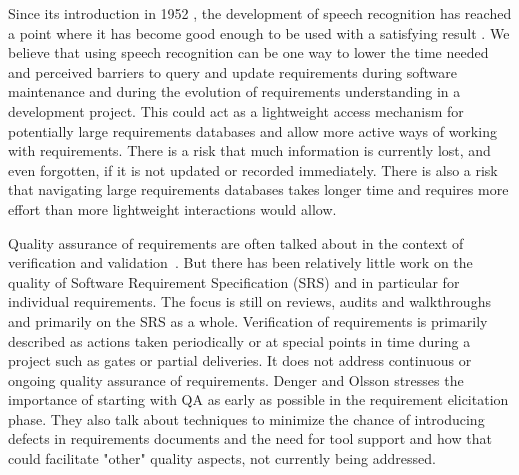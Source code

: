 \documentclass[conference]{IEEEtran}
\begin{document}
Since its introduction in 1952 \cite{davis1952}, the development of speech recognition has reached a point where it has become good enough to be used with a satisfying result \cite{ballinger2011speech,ballinger2010lang,schalkwyk2010}. We believe that using speech recognition can be one way to lower the time needed and perceived barriers to query and update requirements during software maintenance and during the evolution of requirements understanding in a development project. This could act as a lightweight access mechanism for potentially large requirements databases and allow more active ways of working with requirements. There is a risk that much information is currently lost, and even forgotten, if it is not updated or recorded immediately. 
There is also a risk that navigating large requirements databases takes longer time and requires more effort than more lightweight interactions would allow.

Quality assurance of requirements are often talked about in the context of verification and validation~\cite{reqqa,qualitybook}. But there has been relatively little work on the quality of Software Requirement Specification (SRS) and in particular for individual requirements. The focus is still on reviews, audits and walkthroughs and primarily on the SRS as a whole. Verification of requirements is primarily described as actions taken periodically or at special points in time during a project such as gates or partial deliveries. It does not address continuous or ongoing quality assurance of requirements. Denger and Olsson \cite{reqqa} stresses the importance of starting with QA as early as possible in the requirement elicitation phase. They also talk about techniques to minimize the chance of introducing defects in requirements documents and the need for tool support and how that could facilitate "other" quality aspects, not currently being addressed.
\end{document}
